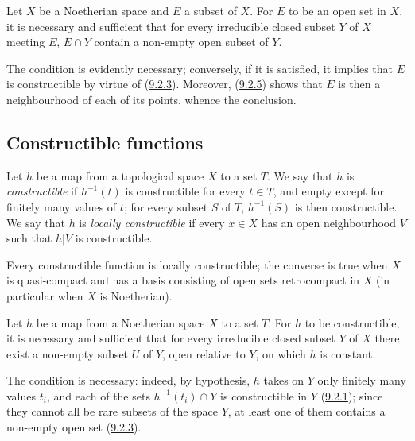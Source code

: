\begin{corollary}[9.2.6]
\label{0.9.2.6}
Let $X$ be a Noetherian space and $E$ a subset of $X$. For $E$ to be an
open set in $X$, it is necessary and sufficient that for every irreducible
closed subset $Y$ of $X$ meeting $E$, $E\cap Y$ contain a non-empty
open subset of $Y$.
\end{corollary}

The condition is evidently necessary; conversely, if it is satisfied,
it implies that $E$ is constructible by virtue of
(\hyperref[0.9.2.3]{9.2.3}). Moreover,
(\hyperref[0.9.2.5]{9.2.5}) shows that $E$ is then a neighbourhood of each
of its points, whence the conclusion.

\subsection{Constructible functions}
\label{subsection:0.9.3}

\begin{definition}[9.3.1]
\label{0.9.3.1}
Let $h$ be a map from a topological space $X$ to a set $T$.
We say that $h$ is \emph{constructible} if $h^{-1}(t)$ is constructible for
every $t\in T$, and empty except for finitely many values of $t$; for
every subset $S$ of $T$, $h^{-1}(S)$ is then constructible. We say that $h$
is \emph{locally constructible} if every $x\in X$ has an open
neighbourhood $V$ such that $h|V$ is constructible.
\end{definition}

Every constructible function is locally constructible; the converse
is true when $X$ is quasi-compact and has a basis consisting of
open sets retrocompact in $X$ (in particular when $X$ is Noetherian).

\begin{proposition}[9.3.2]
\label{0.9.3.2}
Let $h$ be a map from a Noetherian space $X$ to a set $T$.
For $h$ to be constructible, it is necessary and sufficient that for every
irreducible closed subset $Y$ of $X$ there exist a non-empty subset $U$ of
$Y$, open relative to $Y$, on which $h$ is constant.
\end{proposition}

The condition is necessary: indeed, by hypothesis, $h$ takes on $Y$
only finitely many values $t_i$, and each of the sets
$h^{-1}(t_i)\cap Y$ is constructible in $Y$
(\hyperref[0.9.2.1]{9.2.1}); since they cannot all be rare subsets
of the space $Y$, at least one of them contains a non-empty open set
(\hyperref[0.9.2.3]{9.2.3}).

